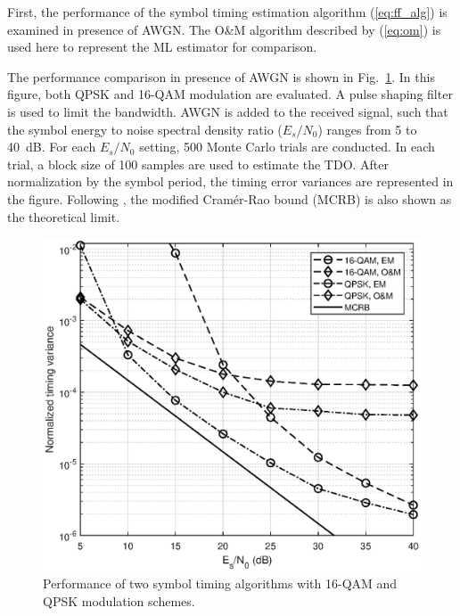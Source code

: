 \documentclass[12pt, draftclsnofoot, onecolumn]{IEEEtran}
\begin{document}

First, the performance of the symbol timing estimation algorithm (\ref{eq:ff_alg}) is examined in presence of AWGN.
The O\&M algorithm
described by (\ref{eq:om})
is used here to represent the ML estimator for comparison.

The performance comparison in presence of AWGN is shown in Fig.~\ref{fig:timing_per}.
In this figure, both QPSK and 16-QAM modulation are evaluated.
A pulse shaping filter is used to limit the bandwidth.
AWGN is added to the received signal, such that the symbol energy to noise spectral density ratio (\(E_s/N_0\)) ranges from 5 to 40~dB. 
For each \(E_s/N_0\) setting, 500 Monte Carlo trials are conducted.
In each trial, a block size of 100 samples are used to estimate the TDO.
After normalization by the symbol period, the timing error variances are represented in the figure.
Following \cite{mengali1997synchronization}, the modified Cram\'er-Rao bound (MCRB) is also shown as the theoretical limit.

\begin{figure}[ht]
\centering
\includegraphics[width=3 in]{pic/per_timing-k.eps}
\caption{Performance of two symbol timing algorithms with 16-QAM and QPSK modulation schemes.}
\label{fig:timing_per} 
\end{figure}   
\end{document}
